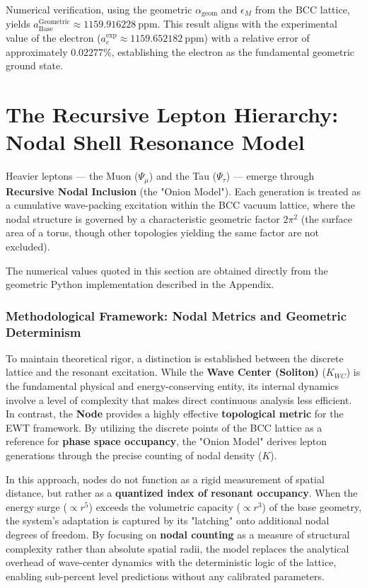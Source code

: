 \documentclass[10pt,a4paper]{article}
\begin{document}
Numerical verification, using the geometric \(\alpha_{\text{geom}}\) and \(\epsilon_M\) from the BCC lattice, yields \(a_{\text{Base}}^{\text{Geometric}} \approx 1159.916228\ \text{ppm}\). This result aligns with the experimental value of the electron (\(a_e^{\text{exp}} \approx 1159.652182\ \text{ppm}\)) with a relative error of approximately \(0.02277\%\), establishing the electron as the fundamental geometric ground state.


\section{The Recursive Lepton Hierarchy: Nodal Shell Resonance Model}
\label{sec:recursive_prediction}

Heavier leptons — the Muon ($\Psi_{\mu}$) and the Tau ($\Psi_{\tau}$) — emerge through \textbf{Recursive Nodal Inclusion} (the "Onion Model"). Each generation is treated as a cumulative wave-packing excitation within the BCC vacuum lattice, where the nodal structure is governed by a characteristic geometric factor $2\pi^2$ (the surface area of a torus, though other topologies yielding the same factor are not excluded).

The numerical values quoted in this section are obtained directly from the geometric Python implementation described in the Appendix.

\subsubsection*{Methodological Framework: Nodal Metrics and Geometric Determinism}
To maintain theoretical rigor, a distinction is established between the discrete lattice and the resonant excitation. While the \textbf{Wave Center (Soliton)} ($K_{WC}$) is the fundamental physical and energy-conserving entity, its internal dynamics involve a level of complexity that makes direct continuous analysis less efficient. In contrast, the \textbf{Node} provides a highly effective \textbf{topological metric} for the EWT framework. By utilizing the discrete points of the BCC lattice as a reference for \textbf{phase space occupancy}, the "Onion Model" derives lepton generations through the precise counting of nodal density ($K$).

In this approach, nodes do not function as a rigid measurement of spatial distance, but rather as a \textbf{quantized index of resonant occupancy}. When the energy surge ($\propto r^5$) exceeds the volumetric capacity ($\propto r^3$) of the base geometry, the system's adaptation is captured by its "latching" onto additional nodal degrees of freedom. By focusing on \textbf{nodal counting} as a measure of structural complexity rather than absolute spatial radii, the model replaces the analytical overhead of wave-center dynamics with the deterministic logic of the lattice, enabling sub-percent level predictions without any calibrated parameters.
\end{document}
